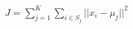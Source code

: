\documentclass[preview]{standalone}
\begin{document}
\begin{align*}
J = \sum_{j=1}^{K} \sum_{i \in S_j} ||x_i - \mu_j||^2
\end{align*}
\end{document}

